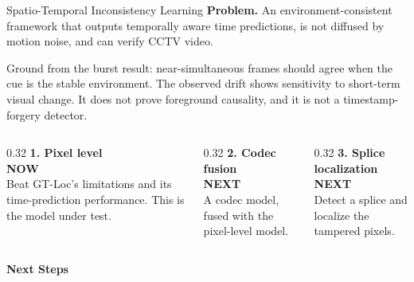 \documentclass[aspectratio=169,11pt]{beamer}
\begin{document}
\begin{frame}{Spatio-Temporal Inconsistency Learning}
\textbf{Problem.} An environment-consistent framework that outputs temporally aware time predictions, is not diffused by motion noise, and can verify CCTV video.
\vspace{0.4em}

{\footnotesize\color{muted}
Ground from the burst result: near-simultaneous frames should agree when the cue is the stable environment. The observed drift shows sensitivity to short-term visual change. It does not prove foreground causality, and it is not a timestamp-forgery detector.}
\vspace{0.7em}

\begin{columns}[T]
\begin{column}{0.32\textwidth}
{\color{aiia}\bfseries 1. Pixel level}\\[0.2em]
{\scriptsize\color{aiia}\bfseries NOW}\\[0.25em]
Beat GT-Loc's limitations and its time-prediction performance. This is the model under test.
\end{column}
\begin{column}{0.32\textwidth}
{\color{aiia}\bfseries 2. Codec fusion}\\[0.2em]
{\scriptsize\color{muted}\bfseries NEXT}\\[0.25em]
A codec model, fused with the pixel-level model.
\end{column}
\begin{column}{0.32\textwidth}
{\color{aiia}\bfseries 3. Splice localization}\\[0.2em]
{\scriptsize\color{muted}\bfseries NEXT}\\[0.25em]
Detect a splice and localize the tampered pixels.
\end{column}
\end{columns}
\end{frame}

\begin{frame}[plain]
\begin{center}
\vspace{2.4cm}
{\color{aiia}\Huge\bfseries Next Steps}
\end{center}
\end{frame}
\end{document}
